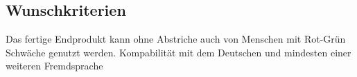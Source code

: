 \subsection{Wunschkriterien}

\begin{requirements}
	Das fertige Endprodukt kann ohne Abstriche auch von Menschen mit Rot-Grün Schwäche genutzt werden.
	Kompabilität mit dem Deutschen und mindesten einer weiteren Fremdsprache
\end{requirements}
